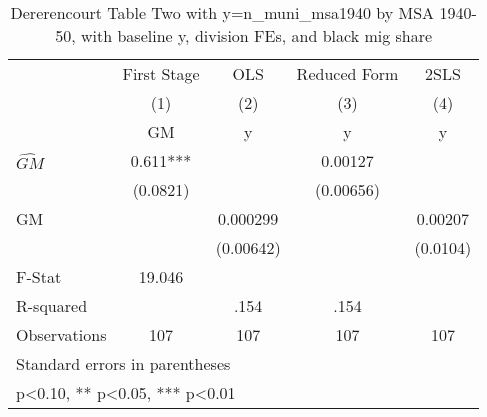 \begin{table}[htbp]\centering
\def\sym#1{\ifmmode^{#1}\else\(^{#1}\)\fi}
\caption{Dererencourt Table Two with y=n\_muni\_msa1940 by MSA 1940-50, with baseline y, division FEs, and black mig share}
\begin{tabular}{l*{4}{c}}
\toprule
                    & First Stage   &         OLS   &Reduced Form   &        2SLS   \\
                    &\multicolumn{1}{c}{(1)}&\multicolumn{1}{c}{(2)}&\multicolumn{1}{c}{(3)}&\multicolumn{1}{c}{(4)}\\
                    &\multicolumn{1}{c}{GM}&\multicolumn{1}{c}{y}&\multicolumn{1}{c}{y}&\multicolumn{1}{c}{y}\\
\midrule
$\hat{GM}$          &       0.611***&               &     0.00127   &               \\
                    &    (0.0821)   &               &   (0.00656)   &               \\
\addlinespace
GM                  &               &    0.000299   &               &     0.00207   \\
                    &               &   (0.00642)   &               &    (0.0104)   \\
\midrule
F-Stat              &      19.046   &               &               &               \\
R-squared           &               &        .154   &        .154   &               \\
Observations        &         107   &         107   &         107   &         107   \\
\bottomrule
\multicolumn{5}{l}{\footnotesize Standard errors in parentheses}\\
\multicolumn{5}{l}{\footnotesize * p<0.10, ** p<0.05, *** p<0.01}\\
\end{tabular}
\end{table}
